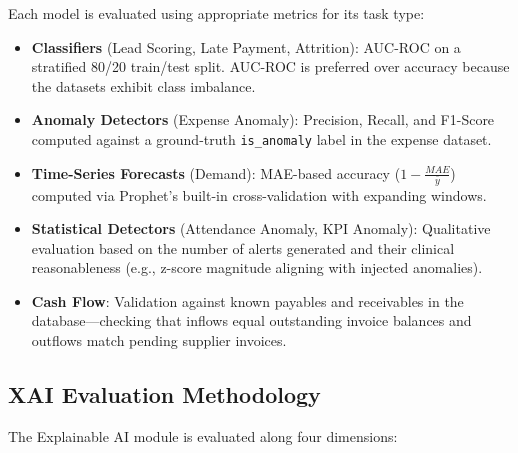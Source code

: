 \documentclass[12pt,a4paper]{report}
\begin{document}
Each model is evaluated using appropriate metrics for its task type:

\begin{itemize}
  \item \textbf{Classifiers} (Lead Scoring, Late Payment, Attrition): AUC-ROC on a stratified 80/20 train/test split. AUC-ROC is preferred over accuracy because the datasets exhibit class imbalance.

  \item \textbf{Anomaly Detectors} (Expense Anomaly): Precision, Recall, and F1-Score computed against a ground-truth \texttt{is\_anomaly} label in the expense dataset.

  \item \textbf{Time-Series Forecasts} (Demand): MAE-based accuracy ($1 - \frac{MAE}{\bar{y}}$) computed via Prophet's built-in cross-validation with expanding windows.

  \item \textbf{Statistical Detectors} (Attendance Anomaly, KPI Anomaly): Qualitative evaluation based on the number of alerts generated and their clinical reasonableness (e.g., z-score magnitude aligning with injected anomalies).

  \item \textbf{Cash Flow}: Validation against known payables and receivables in the database---checking that inflows equal outstanding invoice balances and outflows match pending supplier invoices.
\end{itemize}

\subsection{XAI Evaluation Methodology}
\label{sec:xai_eval_methodology}

The Explainable AI module is evaluated along four dimensions:
\end{document}
